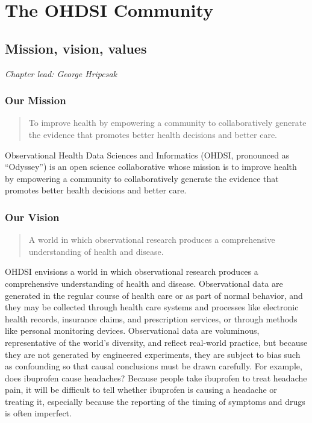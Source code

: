 \documentclass[11pt]{book}
\theoremstyle{definition}
\theoremstyle{definition}
\theoremstyle{definition}
\theoremstyle{remark}
\begin{document}
\mainmatter

\hypertarget{part-the-ohdsi-community}{%
\part{The OHDSI Community}\label{part-the-ohdsi-community}}

\hypertarget{MissionVisionValues}{%
\chapter{Mission, vision, values}\label{MissionVisionValues}}

\emph{Chapter lead: George Hripcsak}

\hypertarget{our-mission}{%
\section{Our Mission}\label{our-mission}}

\begin{quote}
To improve health by empowering a community to collaboratively generate the evidence that promotes better health decisions and better care. 
\end{quote}

Observational Health Data Sciences and Informatics (OHDSI, pronounced as ``Odyssey'') is an open science collaborative whose mission is to improve health by empowering a community to collaboratively generate the evidence that promotes better health decisions and better care.

\hypertarget{our-vision}{%
\section{Our Vision}\label{our-vision}}

\begin{quote}
A world in which observational research produces a comprehensive understanding of health and disease. 
\end{quote}

OHDSI envisions a world in which observational research produces a comprehensive understanding of health and disease. Observational data are generated in the regular course of health care or as part of normal behavior, and they may be collected through health care systems and processes like electronic health records, insurance claims, and prescription services, or through methods like personal monitoring devices. Observational data are voluminous, representative of the world's diversity, and reflect real-world practice, but because they are not generated by engineered experiments, they are subject to bias such as confounding so that causal conclusions must be drawn carefully. For example, does ibuprofen cause headaches? Because people take ibuprofen to treat headache pain, it will be difficult to tell whether ibuprofen is causing a headache or treating it, especially because the reporting of the timing of symptoms and drugs is often imperfect.
\end{document}
